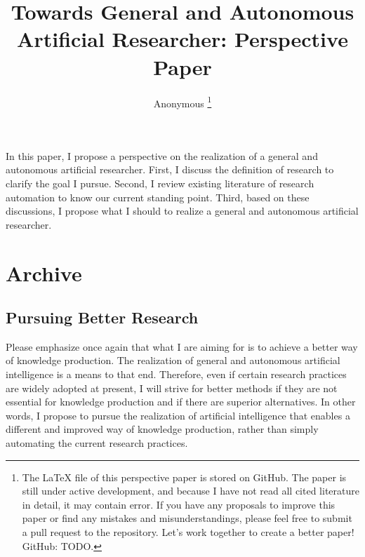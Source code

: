 \documentclass{book}
\title{Towards General and Autonomous Artificial Researcher: Perspective Paper}
\author{Anonymous \footnote{The LaTeX file of this perspective paper is stored on GitHub. The paper is still under active development, and because I have not read all cited literature in detail, it may contain error. If you have any proposals to improve this paper or find any mistakes and misunderstandings, please feel free to submit a pull request to the repository. Let's work together to create a better paper! \\ GitHub: TODO. }}
\newenvironment{abstract}{}{}
\begin{document}
\sloppy
\maketitle
\tableofcontents

\begin{abstract}
    In this paper, I propose a perspective on the realization of a general and autonomous artificial researcher. First, I discuss the definition of research to clarify the goal I pursue. Second, I review existing literature of research automation to know our current standing point. Third, based on these discussions, I propose what I should to realize a general and autonomous artificial researcher.
\end{abstract}







% 



% 


\appendix

\chapter{Archive}

\section{Pursuing Better Research}
Please emphasize once again that what I are aiming for is to achieve a better way of knowledge production. The realization of general and autonomous artificial intelligence is a means to that end. Therefore, even if certain research practices are widely adopted at present, I will strive for better methods if they are not essential for knowledge production and if there are superior alternatives. In other words, I propose to pursue the realization of artificial intelligence that enables a different and improved way of knowledge production, rather than simply automating the current research practices.
\end{document}
